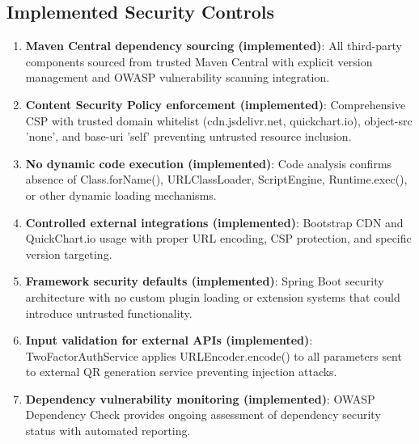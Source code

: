\documentclass[]{UCD_CS_FYP_Report}
\begin{document}
\subsection{Implemented Security Controls}
\begin{enumerate}
	\item \textbf{Maven Central dependency sourcing (implemented)}: All third-party components sourced from trusted Maven Central with explicit version management and OWASP vulnerability scanning integration.
	\item \textbf{Content Security Policy enforcement (implemented)}: Comprehensive CSP with trusted domain whitelist (cdn.jsdelivr.net, quickchart.io), object-src 'none', and base-uri 'self' preventing untrusted resource inclusion.
	\item \textbf{No dynamic code execution (implemented)}: Code analysis confirms absence of Class.forName(), URLClassLoader, ScriptEngine, Runtime.exec(), or other dynamic loading mechanisms.
	\item \textbf{Controlled external integrations (implemented)}: Bootstrap CDN and QuickChart.io usage with proper URL encoding, CSP protection, and specific version targeting.
	\item \textbf{Framework security defaults (implemented)}: Spring Boot security architecture with no custom plugin loading or extension systems that could introduce untrusted functionality.
	\item \textbf{Input validation for external APIs (implemented)}: TwoFactorAuthService applies URLEncoder.encode() to all parameters sent to external QR generation service preventing injection attacks.
	\item \textbf{Dependency vulnerability monitoring (implemented)}: OWASP Dependency Check provides ongoing assessment of dependency security status with automated reporting.
\end{enumerate}
\end{document}
